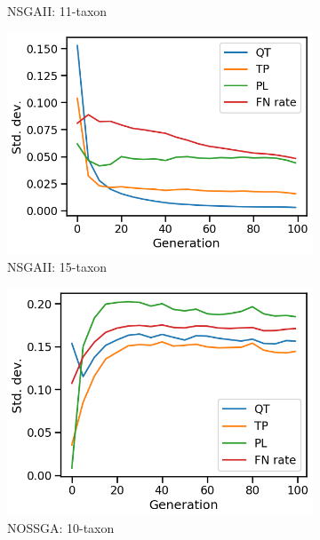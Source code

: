 \begin{figure}[!htbp]
\begin{adjustwidth}{-1cm}{-1cm}
\begin{subfigure}[b]{0.4\textwidth}
			\caption{NSGAII: 11-taxon}
		\end{subfigure}%
		\begin{subfigure}[b]{0.4\textwidth}
			\includegraphics[width=\textwidth]{Figure/15-taxon_NSGAII_std_dev}
			\caption{NSGAII: 15-taxon}
		\end{subfigure}
		\begin{subfigure}[b]{0.4\textwidth}
			\includegraphics[width=\textwidth]{Figure/10-taxon_NOSSGA_std_dev}
			\caption{NOSSGA: 10-taxon}
		\end{subfigure}%
		\begin{subfigure}[b]{0.4\textwidth}

\end{subfigure}
\end{adjustwidth}
\end{figure}

